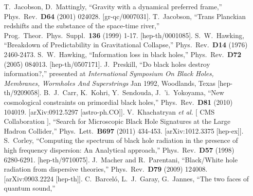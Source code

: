 \documentclass[11pt,a4paper]{article}
\begin{document}
\begin{thebibliography}{666}
  T.~Jacobson, D.~Mattingly,
  ``Gravity with a dynamical preferred frame,''
  Phys.\ Rev.\  {\bf D64 } (2001)  024028.
  [gr-qc/0007031].
  T.~Jacobson,
  ``Trans Planckian redshifts and the substance of the space-time river,''
  Prog.\ Theor.\ Phys.\ Suppl.\  {\bf 136 } (1999)  1-17.
  [hep-th/0001085].
  S.~W.~Hawking,
  ``Breakdown of Predictability in Gravitational Collapse,''
  Phys.\ Rev.\  {\bf D14 } (1976)  2460-2473.
  S.~W.~Hawking,
 ``Information loss in black holes,''
  Phys.\ Rev.\  {\bf D72 } (2005)  084013.
  [hep-th/0507171].
  J.~Preskill,
  ``Do black holes destroy information?,'' presented at
{\it International Symposium On Black Holes, Membranes, Wormholes And Superstrings}
Jan 1992, Woodlands, Texas
  [hep-th/9209058].
  B.~J.~Carr, K.~Kohri, Y.~Sendouda, J.~'i.~Yokoyama,
  ``New cosmological constraints on primordial black holes,''
  Phys.\ Rev.\  {\bf D81 } (2010)  104019.
  [arXiv:0912.5297 [astro-ph.CO]].
  V.~Khachatryan {\it et al.} [ CMS Collaboration ],
  ``Search for Microscopic Black Hole Signatures at the Large Hadron Collider,''
  Phys.\ Lett.\  {\bf B697 } (2011)  434-453.
  [arXiv:1012.3375 [hep-ex]].
  S.~Corley,
  ``Computing the spectrum of black hole radiation in the presence of high
frequency dispersion: An Analytical approach,''
  Phys.\ Rev.\  {\bf D57 } (1998)  6280-6291.
  [hep-th/9710075].
  J.~Macher and R.~Parentani,
  ``Black/White hole radiation from dispersive theories,''
  Phys.\ Rev.\  {\bf D79 } (2009)  124008.
  [arXiv:0903.2224 [hep-th]].
  C.~Barcel\'o, L.~J.~Garay, G.~Jannes,
  ``The two faces of quantum sound,''

\end{thebibliography}
\end{document}
